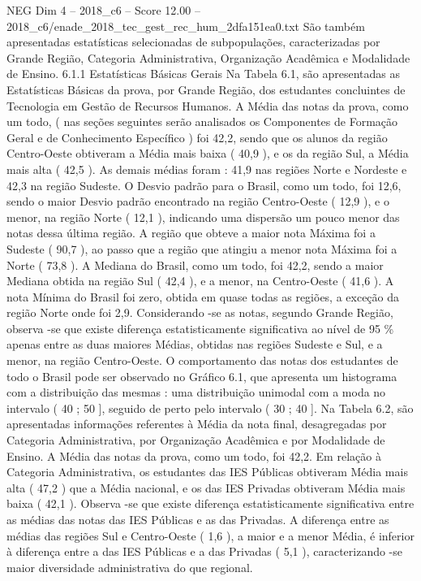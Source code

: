 \begin{textsample}{NEG Dim 4 – 2018\_c6 – Score 12.00 – 2018\_c6/enade\_2018\_tec\_gest\_rec\_hum\_2dfa151ea0.txt}
São também apresentadas estatísticas selecionadas de subpopulações, caracterizadas por Grande Região, Categoria Administrativa, Organização Acadêmica e Modalidade de Ensino. 6.1.1 Estatísticas Básicas Gerais Na Tabela 6.1, são apresentadas as Estatísticas Básicas da prova, por Grande Região, dos estudantes concluintes de Tecnologia em Gestão de Recursos Humanos.
A Média das notas da prova, como um todo, ( nas seções seguintes serão analisados os Componentes de Formação Geral e de Conhecimento Específico ) foi 42,2, sendo que os alunos da região Centro-Oeste obtiveram a Média mais baixa ( 40,9 ), e os da região Sul, a Média mais alta ( 42,5 ).
As demais médias foram : 41,9 nas regiões Norte e Nordeste e 42,3 na região Sudeste.
O Desvio padrão para o Brasil, como um todo, foi 12,6, sendo o maior Desvio padrão encontrado na região Centro-Oeste ( 12,9 ), e o menor, na região Norte ( 12,1 ), indicando uma dispersão um pouco menor das notas dessa última região.
A região que obteve a maior nota Máxima foi a Sudeste ( 90,7 ), ao passo que a região que atingiu a menor nota Máxima foi a Norte ( 73,8 ).
A Mediana do Brasil, como um todo, foi 42,2, sendo a maior Mediana obtida na região Sul ( 42,4 ), e a menor, na Centro-Oeste ( 41,6 ).
A nota Mínima do Brasil foi zero, obtida em quase todas as regiões, a exceção da região Norte onde foi 2,9.
Considerando -se as notas, segundo Grande Região, observa -se que existe diferença estatisticamente significativa ao nível de 95 \% apenas entre as duas maiores Médias, obtidas nas regiões Sudeste e Sul, e a menor, na região Centro-Oeste.
O comportamento das notas dos estudantes de todo o Brasil pode ser observado no Gráfico 6.1, que apresenta um histograma com a distribuição das mesmas : uma distribuição unimodal com a moda no intervalo ( 40 ; 50 ], seguido de perto pelo intervalo ( 30 ; 40 ].
Na Tabela 6.2, são apresentadas informações referentes à Média da nota final, desagregadas por Categoria Administrativa, por Organização Acadêmica e por Modalidade de Ensino.
A Média das notas da prova, como um todo, foi 42,2.
Em relação à Categoria Administrativa, os estudantes das IES Públicas obtiveram Média mais alta ( 47,2 ) que a Média nacional, e os das IES Privadas obtiveram Média mais baixa ( 42,1 ).
Observa -se que existe diferença estatisticamente significativa entre as médias das notas das IES Públicas e as das Privadas.
A diferença entre as médias das regiões Sul e Centro-Oeste ( 1,6 ), a maior e a menor Média, é inferior à diferença entre a das IES Públicas e a das Privadas ( 5,1 ), caracterizando -se maior diversidade administrativa do que regional.

\end{textsample}
